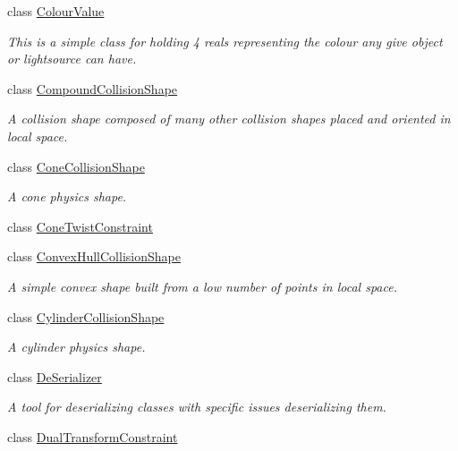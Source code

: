 \begin{DoxyCompactItemize}
class \hyperlink{classMezzanine_1_1ColourValue}{ColourValue}
\begin{DoxyCompactList}\small\item\em This is a simple class for holding 4 reals representing the colour any give object or lightsource can have. \item\end{DoxyCompactList}\item 
class \hyperlink{classMezzanine_1_1CompoundCollisionShape}{CompoundCollisionShape}
\begin{DoxyCompactList}\small\item\em A collision shape composed of many other collision shapes placed and oriented in local space. \item\end{DoxyCompactList}\item 
class \hyperlink{classMezzanine_1_1ConeCollisionShape}{ConeCollisionShape}
\begin{DoxyCompactList}\small\item\em A cone physics shape. \item\end{DoxyCompactList}\item 
class \hyperlink{classMezzanine_1_1ConeTwistConstraint}{ConeTwistConstraint}
\item 
class \hyperlink{classMezzanine_1_1ConvexHullCollisionShape}{ConvexHullCollisionShape}
\begin{DoxyCompactList}\small\item\em A simple convex shape built from a low number of points in local space. \item\end{DoxyCompactList}\item 
class \hyperlink{classMezzanine_1_1CylinderCollisionShape}{CylinderCollisionShape}
\begin{DoxyCompactList}\small\item\em A cylinder physics shape. \item\end{DoxyCompactList}\item 
class \hyperlink{classMezzanine_1_1DeSerializer}{DeSerializer}
\begin{DoxyCompactList}\small\item\em A tool for deserializing classes with specific issues deserializing them. \item\end{DoxyCompactList}\item 
class \hyperlink{classMezzanine_1_1DualTransformConstraint}{DualTransformConstraint}

\end{DoxyCompactItemize}
